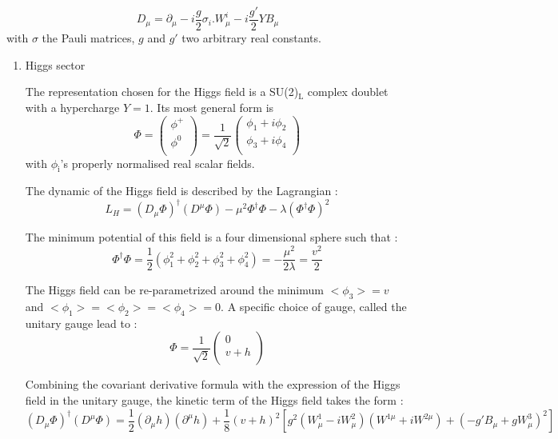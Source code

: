 \begin{equation}
\label{eq:orgb1ab3fc}
D_\mu = \partial_\mu - i\frac{g}{2}\sigma_i.W_\mu^i - i\frac{g'}{2}YB_\mu
\end{equation}
with \(\sigma\) the Pauli matrices, $g$ and $g'$ two arbitrary real constants.

\begin{enumerate}
\item Higgs sector
\label{sec:org4acdc8d}

The representation chosen for the Higgs field is a SU(2)\(_{\text{L}}\) complex doublet with a hypercharge \(Y=1\).
Its most general form is
\begin{equation}
\Phi =
\left(
\begin{array}{l}
\phi^+\\
\phi^0\\
\end{array}
\right)
= \frac{1}{\sqrt{2}}
\left(
\begin{array}{l}
\phi_1 + i \phi_2\\
\phi_3 + i \phi_4\\
\end{array}
\right)
\end{equation}
with \(\phi_{\text{i}}\)'s properly normalised real scalar fields.

The dynamic of the Higgs field is described by the Lagrangian :
\begin{equation}
L_H = (D_\mu\Phi)^\dagger (D^\mu \Phi) - \mu^2 \Phi^\dagger \Phi - \lambda (\Phi^\dagger\Phi)^2
\end{equation}

The minimum potential of this field is a four dimensional sphere such that :
\begin{equation}
\Phi^\dagger \Phi = \frac{1}{2}(\phi_1^2+\phi^2_2 +\phi_3^2 + \phi_4^2) = - \frac{\mu^2}{2\lambda} = \frac{v^2}{2}
\end{equation}

The Higgs field can be re-parametrized around the minimum \(<\phi_3>=v\) and \(<\phi_1>=<\phi_2>=<\phi_4>=0\).
A specific choice of gauge, called the unitary gauge lead to :
\begin{equation}
\Phi = \frac{1}{\sqrt{2}} \left(
\begin{array}{c}
0\\ v+h \\
\end{array}
\right)
\end{equation}


Combining the covariant derivative formula with the expression of the Higgs field in the unitary gauge, the kinetic term of the Higgs field takes the form :
\begin{equation}
(D_\mu\Phi)^\dagger (D^\mu \Phi)
= \frac{1}{2}(\partial_\mu h)(\partial^\mu h)
+\frac{1}{8}(v+h)^2 \left[ g^2(W_\mu^1-iW_\mu^2)(W^{1\mu} + iW^{2\mu}) + (-g'B_\mu + g W^3_\mu)^2 \right]
\end{equation}


\end{enumerate}
